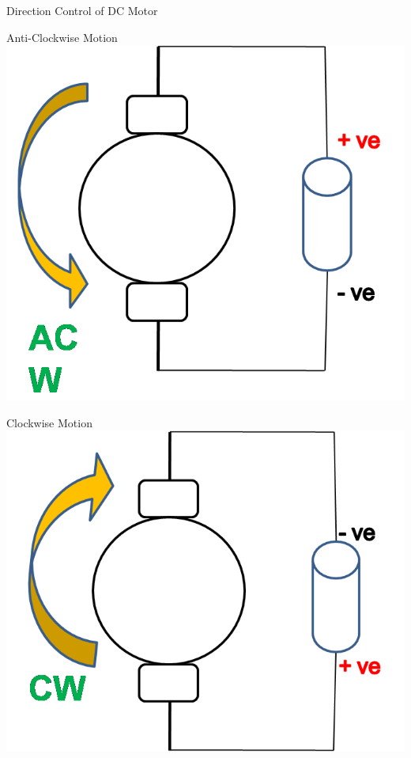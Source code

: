 \documentclass[table,10pt,red]{beamer}
\begin{document}
\begin{frame}{Direction Control of DC Motor}
	\begin{minipage}[c]{0.4\textwidth}\pause
		Anti-Clockwise Motion	\\[10pt]
			\includegraphics[width=\linewidth]{Motor_ACW}
		\end{minipage}
	\hfill \pause
	\begin{minipage}[c]{0.4\textwidth}\pause
			Clockwise Motion	\\[10pt]
			\includegraphics[width=\linewidth]{Motor_CW}
		\end{minipage}
	\hfill
\end{frame}
\end{document}
